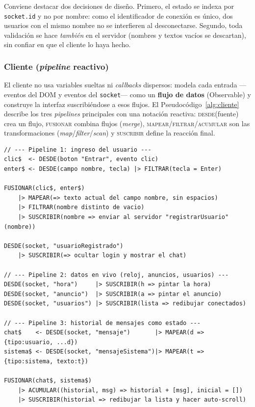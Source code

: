\documentclass[12pt,a4paper]{article}
\begin{document}
Conviene destacar dos decisiones de diseño. Primero, el estado se indexa por \texttt{socket.id} y no por nombre: como el identificador de conexión es único, dos usuarios con el mismo nombre no se interfieren al desconectarse. Segundo, toda validación se hace \emph{también} en el servidor (nombres y textos vacíos se descartan), sin confiar en que el cliente lo haya hecho.

\subsubsection{Cliente (\textit{pipeline} reactivo)}

El cliente no usa variables sueltas ni \textit{callbacks} dispersos: modela cada entrada —eventos del DOM y eventos del \texttt{socket}— como un \textbf{flujo de datos} (Observable) y construye la interfaz suscribiéndose a esos flujos. El Pseudocódigo~\ref{alg:cliente} describe los tres \textit{pipelines} principales con una notación reactiva: \textsc{desde}(fuente) crea un flujo, \textsc{fusionar} combina flujos (\textit{merge}), \textsc{mapear}/\textsc{filtrar}/\textsc{acumular} son las transformaciones (\textit{map}/\textit{filter}/\textit{scan}) y \textsc{suscribir} define la reacción final.

\begin{lstlisting}[caption={Pseudocódigo del comportamiento reactivo del cliente.}, label={alg:cliente}]
// --- Pipeline 1: ingreso del usuario ---
clic$  <- DESDE(boton "Entrar", evento clic)
enter$ <- DESDE(campo nombre, tecla) |> FILTRAR(tecla = Enter)

FUSIONAR(clic$, enter$)
    |> MAPEAR(=> texto actual del campo nombre, sin espacios)
    |> FILTRAR(nombre distinto de vacio)
    |> SUSCRIBIR(nombre => enviar al servidor "registrarUsuario"(nombre))

DESDE(socket, "usuarioRegistrado")
    |> SUSCRIBIR(=> ocultar login y mostrar el chat)

// --- Pipeline 2: datos en vivo (reloj, anuncios, usuarios) ---
DESDE(socket, "hora")     |> SUSCRIBIR(h => pintar la hora)
DESDE(socket, "anuncio")  |> SUSCRIBIR(a => pintar el anuncio)
DESDE(socket, "usuarios") |> SUSCRIBIR(lista => redibujar conectados)

// --- Pipeline 3: historial de mensajes como estado ---
chat$    <- DESDE(socket, "mensaje")       |> MAPEAR(d => {tipo:usuario, ...d})
sistema$ <- DESDE(socket, "mensajeSistema")|> MAPEAR(t => {tipo:sistema, texto:t})

FUSIONAR(chat$, sistema$)
    |> ACUMULAR((historial, msg) => historial + [msg], inicial = [])
    |> SUSCRIBIR(historial => redibujar la lista y hacer auto-scroll)
\end{lstlisting}
\end{document}
